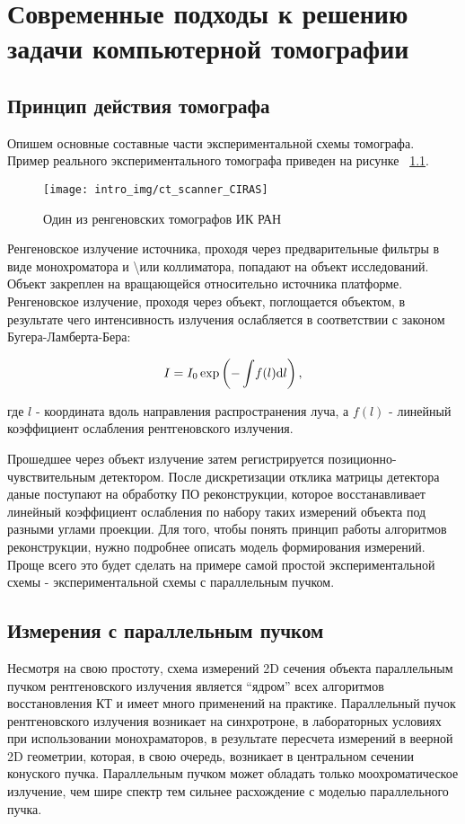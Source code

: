 \chapter{Современные подходы к решению задачи компьютерной томографии}
\section{Принцип действия томографа}
Опишем основные составные части экспериментальной схемы томографа.
Пример реального экспериментального томографа приведен на рисунке ~\ref{fig:ct_scanner}.

\begin{figure}
\centering
\label{fig:ct_scanner}
\texttt{[image: intro\_img/ct\_scanner\_CIRAS]}
\caption{Один из ренгеновских томографов ИК РАН}
\end{figure}

Ренгеновское излучение источника, проходя через предварительные фильтры в виде монохроматора и \textbackslash или коллиматора, попадают на объект исследований.
Объект закреплен на вращающейся относительно источника платформе.
Ренгеновское излучение, проходя через объект, поглощается объектом, в результате чего интенсивность излучения ослабляется в соответствии с законом Бугера-Ламберта-Бера:

\begin{equation}
\notag
I = I_0 \exp\left( {-\int \! f(l) \mathrm d l }\right),
\end{equation}

где $l$ -  координата вдоль направления распространения луча, а $f(l)$ - линейный коэффициент ослабления рентгеновского излучения.

Прошедшее через объект излучение затем регистрируется позиционно-чувствительным детектором.
После дискретизации отклика матрицы детектора даные поступают на обработку ПО реконструкции, которое восстанавливает линейный коэффициент ослабления по набору таких измерений объекта под разными углами проекции.
Для того, чтобы понять принцип работы алгоритмов реконструкции, нужно подробнее описать модель формирования измерений.
Проще всего это будет сделать на примере самой простой экспериментальной схемы - экспериментальной схемы с параллельным пучком.

\section{Измерения с параллельным пучком}
Несмотря на свою простоту, схема измерений 2D сечения объекта параллельным пучком рентгеновского излучения является ``ядром'' всех алгоритмов восстановления КТ и имеет много применений на практике.
Параллельный пучок рентгеновского излучения возникает на синхротроне, в лабораторных условиях при использовании монохраматоров, в результате пересчета измерений в веерной 2D геометрии, которая, в свою очередь, возникает в центральном сечении конуского пучка.
Параллельным пучком может обладать только моохроматическое излучение, чем шире спектр тем сильнее расхождение с моделью параллельного пучка.


